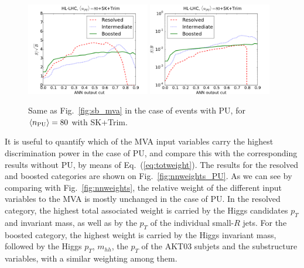 \begin{figure}[t]
\begin{center}
\includegraphics[width=0.48\textwidth]{plots/ssb_SKPU80.pdf}
\includegraphics[width=0.48\textwidth]{plots/sb_SKPU80.pdf}
\caption{\small 
Same as Fig.~\ref{fig:sb_mva} in the
case of events with PU, for
$\left\langle n_{\rm PU}\right\rangle=80$ with SK+Trim.
}
\label{fig:sb_mva_PU}
\end{center}
\end{figure}

It is useful to quantify which of the MVA input variables
carry the highest discrimination power
in the case of PU,
and compare this with the corresponding
results without PU, by means of
Eq.~(\ref{eq:totweight}).
%
The 
results for the resolved and boosted categories are shown
on Fig.~\ref{fig:nnweights_PU}.
%
As we can see by comparing with Fig.~\ref{fig:nnweights}, 
the relative weight of the different input variables to the MVA
is mostly unchanged in the case of PU.
%
In the resolved category, the highest total associated weight is carried
by the Higgs candidates $p_T$ and invariant mass, as well
as by the $p_T$ of the individual small-$R$ jets.
%
For the boosted category, the highest weight is carried by the
Higgs invariant mass, followed by
the Higgs $p_T$, $m_{hh}$, the $p_T$ of the AKT03 subjets and the
substructure variables, with a similar weighting among them.


